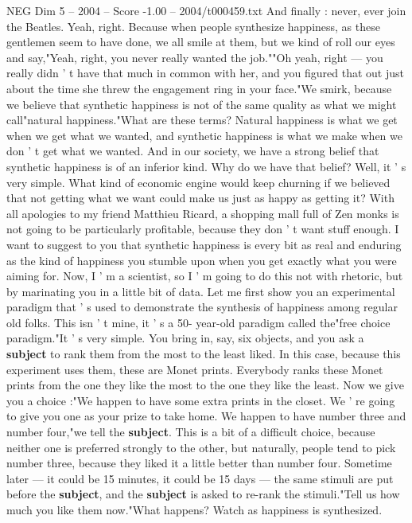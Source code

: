 \begin{textsample}{NEG Dim 5 – 2004 – Score -1.00 – 2004/t000459.txt}
And finally : never, ever join the Beatles.
Yeah, right.
Because when people synthesize happiness, as these gentlemen seem to have done, we all smile at them, but we kind of roll our eyes and say,"Yeah, right, you never really wanted the job.""Oh yeah, right — you really didn ' t have that much in common with her, and you figured that out just about the time she threw the engagement ring in your face."We smirk, because we believe that synthetic happiness is not of the same quality as what we might call"natural happiness."What are these terms?
Natural happiness is what we get when we get what we wanted, and synthetic happiness is what we make when we don ' t get what we wanted.
And in our society, we have a strong belief that synthetic happiness is of an inferior kind.
Why do we have that belief?
Well, it ' s very simple.
What kind of economic engine would keep churning if we believed that not getting what we want could make us just as happy as getting it?
With all apologies to my friend Matthieu Ricard, a shopping mall full of Zen monks is not going to be particularly profitable, because they don ' t want stuff enough.
I want to suggest to you that synthetic happiness is every bit as real and enduring as the kind of happiness you stumble upon when you get exactly what you were aiming for.
Now, I ' m a scientist, so I ' m going to do this not with rhetoric, but by marinating you in a little bit of data.
Let me first show you an experimental paradigm that ' s used to demonstrate the synthesis of happiness among regular old folks.
This isn ' t mine, it ' s a 50- year-old paradigm called the"free choice paradigm."It ' s very simple.
You bring in, say, six objects, and you ask a \textbf{subject} to rank them from the most to the least liked.
In this case, because this experiment uses them, these are Monet prints.
Everybody ranks these Monet prints from the one they like the most to the one they like the least.
Now we give you a choice :"We happen to have some extra prints in the closet.
We ' re going to give you one as your prize to take home.
We happen to have number three and number four,"we tell the \textbf{subject}.
This is a bit of a difficult choice, because neither one is preferred strongly to the other, but naturally, people tend to pick number three, because they liked it a little better than number four.
Sometime later — it could be 15 minutes, it could be 15 days — the same stimuli are put before the \textbf{subject}, and the \textbf{subject} is asked to re-rank the stimuli."Tell us how much you like them now."What happens?
Watch as happiness is synthesized.

\end{textsample}

